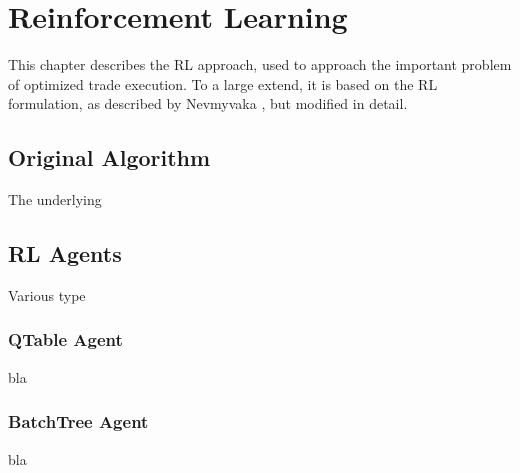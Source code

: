 \chapter{Reinforcement Learning}
\label{chap:reinforcementlearning}
This chapter describes the \ac{RL} approach, used to approach the important problem of optimized trade execution. To a large extend, it is based on the \ac{RL} formulation, as described by Nevmyvaka \etal \cite{Nevmyvaka:2006}, but modified in detail. 

\section{Original Algorithm}
The underlying 

\section{RL Agents}
Various type

\subsection{QTable Agent}
bla

\subsection{BatchTree Agent}
bla


\cleardoublepage{}